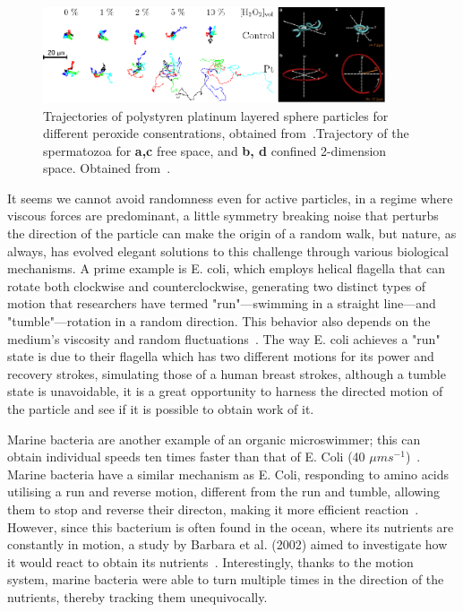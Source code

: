 \begin{figure}[h]
  \begin{center}
    \includegraphics[width=0.90\textwidth]{figures/randomwalk.pdf}
  \end{center}
  \caption[Random Walk for active brownian particles.]{Trajectories of polystyren platinum layered sphere particles for different peroxide consentrations, obtained from~\cite{howse2007self}.Trajectory of the spermatozoa for \textbf{a,c} free space, and \textbf{b, d} confined 2-dimension space. Obtained from~\cite{corkidi2008tracking}.}\label{fig:corkidiexperiment}
\end{figure}



It seems we cannot avoid randomness even for active particles, in a regime where viscous forces are predominant, a little symmetry breaking noise that perturbs the direction of the particle can make the origin of a random walk, but nature, as always, has evolved elegant solutions to this challenge through various biological mechanisms. A prime example is E. coli, which employs helical flagella that can rotate both clockwise and counterclockwise, generating two distinct types of motion that researchers have termed "run"—swimming in a straight line—and "tumble"—rotation in a random direction. This behavior also depends on the medium's viscosity and random fluctuations~\cite{kumar2010physics}. The way E. coli achieves a "run" state is due to their flagella which has two different motions for its power and recovery strokes, simulating those of a human breast strokes, although a tumble state is unavoidable, it is a great opportunity to harness the directed motion of the particle and see if it is possible to obtain work of it. 


Marine bacteria are another example of an organic microswimmer; this can obtain individual speeds ten times faster than that of E. Coli (40 $\mu m s^{-1}$)~\cite{mitchell1995long, lowe1987rapid}. Marine bacteria have a similar mechanism as E. Coli, responding to amino acids utilising a run and reverse motion, different from the run and tumble, allowing them to stop and reverse their directon, making it more efficient reaction~\cite{barbara2003marine}. However, since this bacterium is often found in the ocean, where its nutrients are constantly in motion, a study by Barbara et al. (2002) aimed to investigate how it would react to obtain its nutrients~\cite{barbara2003bacterial}. Interestingly, thanks to the motion system, marine bacteria were able to turn multiple times in the direction of the nutrients, thereby tracking them unequivocally.

